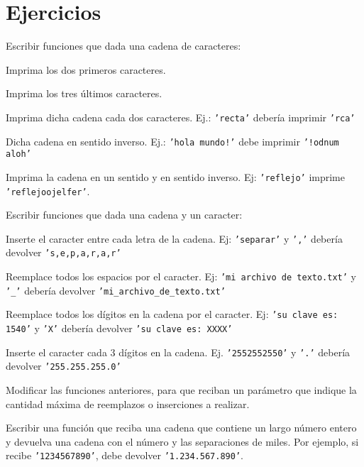 \newpage
\section{Ejercicios}

\begin{ejercicio}
Escribir funciones que dada una cadena de caracteres:
\begin{partes}
\item Imprima los dos primeros caracteres.
\item Imprima los tres últimos caracteres.
\item Imprima dicha cadena cada dos caracteres. Ej.: \texttt{'recta'} debería
imprimir \texttt{'rca'}
\item Dicha cadena en sentido inverso. Ej.: \texttt{'hola mundo!'} debe
imprimir \texttt{'!odnum aloh'}
\item Imprima la cadena en un sentido y en sentido inverso. Ej:
\texttt{'reflejo'} imprime \texttt{'reflejoojelfer'}.
\end{partes}
\end{ejercicio}


\begin{ejercicio}
Escribir funciones que dada una cadena y un caracter:
\begin{partes}
\item Inserte el caracter entre cada letra de la cadena. Ej: \texttt{'separar'}
y \texttt{','} debería devolver \texttt{'s,e,p,a,r,a,r'}
\item Reemplace todos los espacios por el caracter. Ej: \texttt{'mi archivo de
texto.txt'} y \texttt{'\_'} debería devolver
\texttt{'mi\_archivo\_de\_texto.txt'}
\item Reemplace todos los dígitos en la cadena por el caracter. Ej: \texttt{'su
clave es: 1540'} y \texttt{'X'} debería devolver \texttt{'su clave es: XXXX'}
\item Inserte el caracter cada 3 dígitos en la cadena. Ej.
\texttt{'2552552550'} y \texttt{'.'} debería devolver \texttt{'255.255.255.0'}
\end{partes}
\end{ejercicio}


\begin{ejercicio}
Modificar las funciones anteriores, para que reciban un parámetro que indique
la cantidad máxima de reemplazos o inserciones a realizar.
\end{ejercicio}


\begin{ejercicio}
Escribir una función que reciba una cadena que contiene un largo número entero y
devuelva una cadena con el número y las separaciones de miles. Por ejemplo, si
recibe \texttt{'1234567890'}, debe devolver \texttt{'1.234.567.890'}.
\end{ejercicio}


